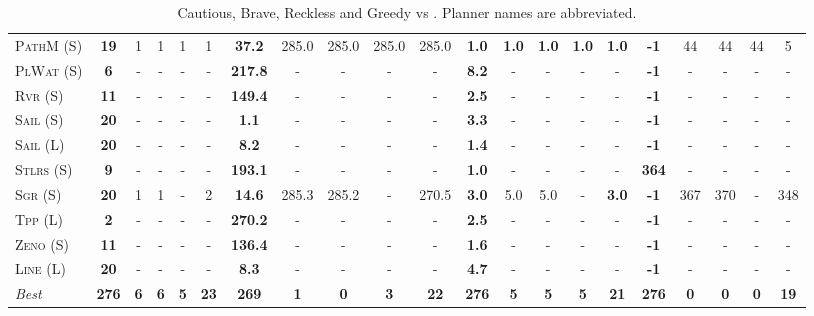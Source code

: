 \begin{table}[tb]
{\begin{tabular}{|l||ccccc||ccccc||ccccc||ccccc||}
\textsc{PathM} (S)&\textbf{19}&1&1&1&1&\textbf{37.2}&285.0&285.0&285.0&285.0&\textbf{1.0}&\textbf{1.0}&\textbf{1.0}&\textbf{1.0}&\textbf{1.0}&\textbf{-1}&44&44&44&5\\
\textsc{PlWat} (S)&\textbf{6}&-&-&-&-&\textbf{217.8}&-&-&-&-&\textbf{8.2}&-&-&-&-&\textbf{-1}&-&-&-&-\\
\textsc{Rvr} (S)&\textbf{11}&-&-&-&-&\textbf{149.4}&-&-&-&-&\textbf{2.5}&-&-&-&-&\textbf{-1}&-&-&-&-\\
\textsc{Sail} (S)&\textbf{20}&-&-&-&-&\textbf{1.1}&-&-&-&-&\textbf{3.3}&-&-&-&-&\textbf{-1}&-&-&-&-\\
\textsc{Sail} (L)&\textbf{20}&-&-&-&-&\textbf{8.2}&-&-&-&-&\textbf{1.4}&-&-&-&-&\textbf{-1}&-&-&-&-\\
\textsc{Stlrs} (S)&\textbf{9}&-&-&-&-&\textbf{193.1}&-&-&-&-&\textbf{1.0}&-&-&-&-&\textbf{364}&-&-&-&-\\
\textsc{Sgr} (S)&\textbf{20}&1&1&-&2&\textbf{14.6}&285.3&285.2&-&270.5&\textbf{3.0}&5.0&5.0&-&\textbf{3.0}&\textbf{-1}&367&370&-&348\\
\textsc{Tpp} (L)&\textbf{2}&-&-&-&-&\textbf{270.2}&-&-&-&-&\textbf{2.5}&-&-&-&-&\textbf{-1}&-&-&-&-\\
\textsc{Zeno} (S)&\textbf{11}&-&-&-&-&\textbf{136.4}&-&-&-&-&\textbf{1.6}&-&-&-&-&\textbf{-1}&-&-&-&-\\
\textsc{Line} (L)&\textbf{20}&-&-&-&-&\textbf{8.3}&-&-&-&-&\textbf{4.7}&-&-&-&-&\textbf{-1}&-&-&-&-
\\\hline
\textit{Best}&\textbf{276}&\textbf{6}&\textbf{6}&\textbf{5}&\textbf{23}&\textbf{269}&\textbf{1}&\textbf{0}&\textbf{3}&\textbf{22}&\textbf{276}&\textbf{5}&\textbf{5}&\textbf{5}&\textbf{21}&\textbf{276}&\textbf{0}&\textbf{0}&\textbf{0}&\textbf{19}\\\hline

        \end{tabular}}
        \caption{Cautious, Brave, Reckless and Greedy \pattyd vs \pattyo. Planner names are abbreviated.}
        \label{tab:cbrg}
        \end{table}
        